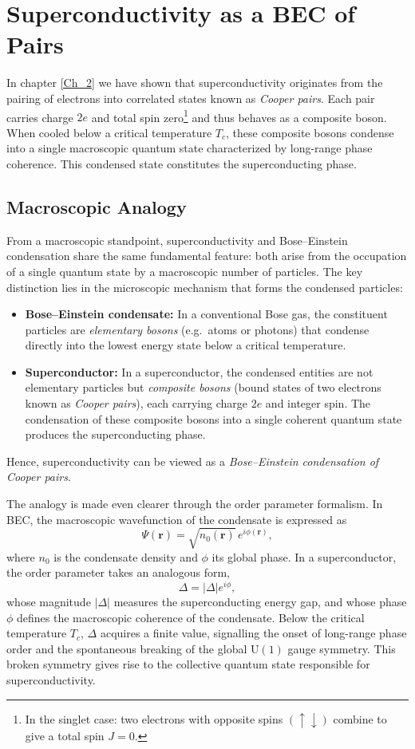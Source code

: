 
\chapter{Superconductivity as a BEC of Pairs}
In chapter \ref{Ch_2} we have shown that superconductivity originates from the pairing of electrons into correlated states known as \textit{Cooper pairs}.  
Each pair carries charge \(2e\) and total spin zero\footnote{In the singlet case: two electrons with opposite spins $(\uparrow\downarrow)$ combine to give a total spin $J = 0$.} and thus behaves as a composite boson.  
When cooled below a critical temperature \(T_c\), these composite bosons condense into a single macroscopic quantum state characterized by long-range phase coherence.  
This condensed state constitutes the superconducting phase.

\section{Macroscopic Analogy}
From a macroscopic standpoint, superconductivity and Bose--Einstein condensation share the same fundamental feature: both arise from the occupation of a single quantum state by a macroscopic number of particles.  
The key distinction lies in the microscopic mechanism that forms the condensed particles:  

\begin{itemize}
    \item \textbf{Bose--Einstein condensate:} In a conventional Bose gas, the constituent particles are \emph{elementary bosons} (e.g.\ atoms or photons) that condense directly into the lowest energy state below a critical temperature.

    \item \textbf{Superconductor:} In a superconductor, the condensed entities are not elementary particles but \emph{composite bosons} (bound states of two electrons known as \emph{Cooper pairs}), each carrying charge \(2e\) and integer spin.
    The condensation of these composite bosons into a single coherent quantum state produces the superconducting phase.
\end{itemize}

Hence, superconductivity can be viewed as a \textit{Bose--Einstein condensation of Cooper pairs}.

The analogy is made even clearer through the order parameter formalism.  
In BEC, the macroscopic wavefunction of the condensate is expressed as 
\[
\Psi(\mathbf{r}) = \sqrt{n_0(\mathbf{r})}\, e^{i\phi(\mathbf{r})},
\]
where \(n_0\) is the condensate density and \(\phi\) its global phase.  
In a superconductor, the order parameter takes an analogous form,
\[
\Delta = |\Delta| e^{i\phi},
\]
whose magnitude \(|\Delta|\) measures the superconducting energy gap, and whose phase \(\phi\) defines the macroscopic coherence of the condensate.  
Below the critical temperature \(T_c\), \(\Delta\) acquires a finite value, signalling the onset of long-range phase order and the spontaneous breaking of the global \(\mathrm{U}(1)\) gauge symmetry.  
This broken symmetry gives rise to the collective quantum state responsible for superconductivity.

